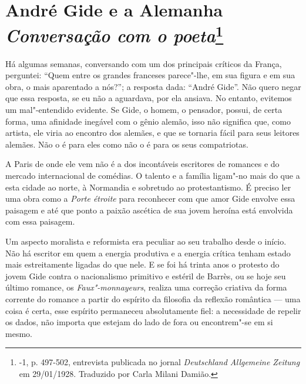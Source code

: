 \chapter*{André Gide e a Alemanha\\
\emph{Conversação com o poeta}\footnote[*]{-1,
  p. 497-502, entrevista publicada no jornal \emph{Deutschland
  Allgemeine Zeitung} em 29/01/1928. Traduzido por Carla Milani Damião.}}


Há algumas semanas, conversando com um dos principais críticos da
França, perguntei: ``Quem entre os grandes franceses parece"-lhe, em sua
figura e em sua obra, o mais aparentado a nós?''; a resposta dada:
``André Gide''. Não quero negar que essa resposta, se eu não a
aguardava, por ela ansiava. No entanto, evitemos um mal"-entendido
evidente. Se Gide, o homem, o pensador, possui, de certa forma, uma
afinidade inegável com o gênio alemão, isso não significa que, como
artista, ele viria ao encontro dos alemães, e que se tornaria fácil para
seus leitores alemães. Não o é para eles como não o é para os seus
compatriotas.

A Paris de onde ele vem não é a dos incontáveis ​​escritores de romances
e do mercado internacional de comédias. O talento e a família ligam"-no
mais do que a esta cidade ao norte, à Normandia e sobretudo ao
protestantismo. É preciso ler uma obra como a \emph{Porte étroite} para
reconhecer com que amor Gide envolve essa paisagem e até que ponto a
paixão ascética de sua jovem heroína está envolvida com essa paisagem.

Um aspecto moralista e reformista era peculiar ao seu trabalho desde o
início. Não há escritor em quem a energia produtiva e a energia crítica
tenham estado mais estreitamente ligadas do que nele. E se foi há trinta
anos o protesto do jovem Gide contra o nacionalismo primitivo e estéril
de Barrès, ou se hoje seu último romance, os \emph{Faux"-monnayeurs},
realiza uma correção criativa da forma corrente do romance a partir do
espírito da filosofia da reflexão romântica --- uma coisa é certa, esse
espírito permaneceu absolutamente fiel: a necessidade de repelir os
dados, não importa que estejam do lado de fora ou encontrem"-se em si
mesmo.

